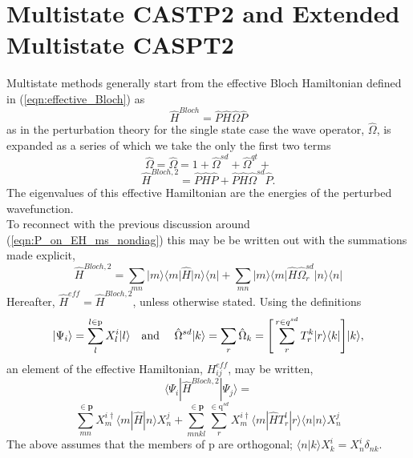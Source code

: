 \section{ Multistate CASTP2 and Extended Multistate CASPT2 }

\noindent Multistate methods generally start from the effective Bloch Hamiltonian defined in 
(\ref{eqn:effective_Bloch}) as 
\begin{equation}
\hat{H}^{Bloch} = \hat{P}\hat{H}\hat{\Omega}\hat{P}
\label{eqn:effective_Bloch_opform}
\end{equation}
as in the perturbation theory for the single state case the wave operator, $\hat{\Omega}$, is expanded as a series 
of which we take the only the first two terms
\begin{equation}
\hat{\Omega} =\hat{\Omega} =  1 + \hat{\Omega}^{sd}+ \hat{\Omega}^{qt}+ 
\end{equation}
\begin{equation}
\hat{H}^{Bloch,2} = \hat{P}\hat{H}\hat{P} +  \hat{P}\hat{H}\hat{\Omega}^{sd}\hat{P}.
\label{eqn:effective_Bloch_opform_secondorder}
\end{equation}
The eigenvalues of this effective Hamiltonian are the energies of the perturbed wavefunction.\\

\noindent To reconnect with the previous discussion around (\ref{eqn:P_on_EH_ms_nondiag}) this may be 
be written out with the summations made explicit,
\begin{equation}
\hat{H}^{Bloch,2} = 
\sum_{mn}|m\rangle\langle m | \hat{H} |n \rangle\langle n|+
\sum_{mn}|m\rangle\langle m | \hat{H}\hat{\Omega}^{sd}_{r} |n \rangle\langle n|
\label{eqn:effective_Bloch_summation_explicit}
\end{equation}
Hereafter, $ \hat{H}^{eff} =  \hat{H}^{Bloch,2} $, unless otherwise stated. Using the definitions 
\begin{equation}
|\Psi_{i}\rangle = \sum_{l}^{l \in \mathrm{p}} X_{l}^{i} | l \rangle
\text{\ \ \ and \ \ \ }
\hat{\Omega}^{sd}| k \rangle  = \sum_{r} \hat{\Omega}_{k} = \Bigg{[}\sum_{r}^{r \in q^{sd}} T^{k}_{r} |r\rangle\langle k |\Bigg{]} |  k \rangle,
\end{equation}
an element of the effective Hamiltonian, $H_{ij}^{eff}$, may be written,
\begin{equation*}
\langle \Psi_{i} | \hat{H}^{Bloch,2} | \Psi_{j} \rangle =
\end{equation*}
\begin{equation}
\sum_{mn}^{\in \mathbf{p}}
X^{i\dagger}_{m} \langle m | \hat{H} |n \rangle  X^{j}_{n}
+\sum_{mnkl}^{\in \mathbf{p} }\sum_{r}^{\in \mathrm{q}^{sd}}
X^{i\dagger}_{m}\langle m |
\hat{H} T^{l}_{r}
|r \rangle\langle n | n \rangle  X^{j}_{n}
\label{eqn:effective_Bloch_summation_explicit}
\end{equation}
The above assumes that the members of p are orthogonal; $\langle n | k \rangle X^{i}_{k} = X^{i}_{n}\delta_{nk}$. \\ 

